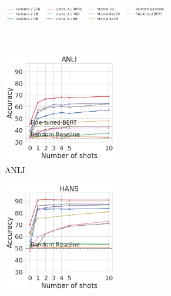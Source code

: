 
\begin{figure}[t]
    \begin{subfigure}[b]{\textwidth}
        \centering
        \includegraphics[width=0.8\textwidth]{figures/legend}
    \end{subfigure}\\
    \begin{subfigure}[b]{0.32\textwidth}
    \centering
    \includegraphics[height=4.8cm]{figures/anli}
    \caption{ANLI}
    \end{subfigure}
    \label{fig:anli}
    \begin{subfigure}[b]{0.32\textwidth}
    \centering
    \includegraphics[height=4.8cm]{figures/hansnli}

\end{subfigure}
\end{figure}
